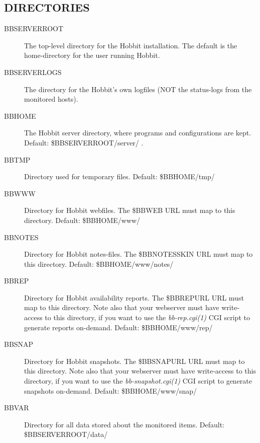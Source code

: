 \subsection{DIRECTORIES}


 \begin{description}
\item[BBSERVERROOT] The top-level directory for the Hobbit installation. The default is the home-directory for the user running Hobbit. 

 

\item[BBSERVERLOGS] The directory for the Hobbit's own logfiles (NOT the status-logs from the monitored hosts). 

 

\item[BBHOME] The Hobbit server directory, where programs and configurations are kept. Default: \$BBSERVERROOT/server/ . 

 

\item[BBTMP] Directory used for temporary files. Default: \$BBHOME/tmp/ 

 

\item[BBWWW] Directory for Hobbit webfiles. The \$BBWEB URL must map to this directory. Default: \$BBHOME/www/ 

 

\item[BBNOTES] Directory for Hobbit notes-files. The \$BBNOTESSKIN URL must map to this directory. Default: \$BBHOME/www/notes/ 

 

\item[BBREP] Directory for Hobbit availability reports. The \$BBREPURL URL must map to this directory. Note also that your webserver must have write-access to this directory, if you want to use the \emph{bb-rep.cgi(1)}
 CGI script to generate reports on-demand. Default: \$BBHOME/www/rep/ 

 

\item[BBSNAP] Directory for Hobbit snapshots. The \$BBSNAPURL URL must map to this directory. Note also that your webserver must have write-access to this directory, if you want to use the \emph{bb-snapshot.cgi(1)}
 CGI script to generate snapshots on-demand. Default: \$BBHOME/www/snap/ 

 

\item[BBVAR] Directory for all data stored about the monitored items. Default: \$BBSERVERROOT/data/ 


\end{description}
